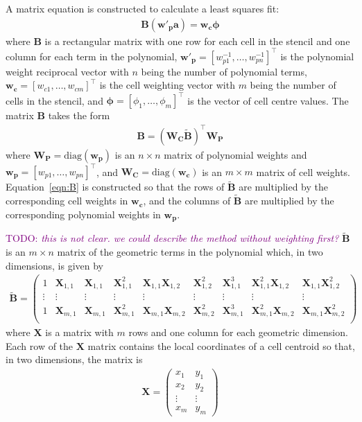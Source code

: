 \documentclass{article}
\newcommand{\TODO}[1]{\textcolor{purple}{TODO: \emph{#1}}}
\begin{document}
A matrix equation is constructed to calculate a least squares fit:
\begin{align}
	\mathbf{B} \left(\mathbf{w'_p} \mathbf{a}\right) = \mathbf{w_c} \bm{\phi}
\end{align}
where $\mathbf{B}$ is a rectangular matrix with one row for each cell in the stencil and one column for each term in the polynomial, $\mathbf{w'_p} = [w_{p1}^{-1}, \ldots, w_{pn}^{-1}]^\intercal$ is the polynomial weight reciprocal vector with $n$ being the number of polynomial terms,  $\mathbf{w_c} = [w_{c1}, \ldots, w_{cm}]^\intercal$ is the cell weighting vector with $m$ being the number of cells in the stencil, and $\bm{\phi} = [\phi_1, \ldots, \phi_m]^\intercal$ is the vector of cell centre values.
The matrix $\mathbf{B}$ takes the form
\begin{align}
	\mathbf{B} = \left( \mathbf{W_C} \mathbf{\tilde{B}} \right)^\intercal \mathbf{W_P} \label{eqn:B}
\end{align}
where $\mathbf{W_P} = \mathrm{diag}(\mathbf{w_p})$ is an $n \times n$ matrix of polynomial weights and $\mathbf{w_p} = [w_{p1}, \ldots, w_{pn}]^\intercal$, and $\mathbf{W_C} = \mathrm{diag}(\mathbf{w_c})$ is an $m \times m$ matrix of cell weights.  Equation~\ref{eqn:B} is constructed so that the rows of $\mathbf{\tilde{B}}$ are multiplied by the corresponding cell weights in $\mathbf{w_c}$, and the columns of $\mathbf{\tilde{B}}$ are multiplied by the corresponding polynomial weights in $\mathbf{w_p}$.

\TODO{this is not clear.  we could describe the method without weighting first?}
$\mathbf{\tilde{B}}$ is an $m \times n$ matrix of the geometric terms in the polynomial which, in two dimensions, is given by
\begin{align}
	\mathbf{\tilde{B}} = 
	\begin{pmatrix}
		1 & \mathbf{X}_{1,1} & \mathbf{X}_{1,1} & \mathbf{X}_{1,1}^2 & \mathbf{X}_{1,1} \mathbf{X}_{1,2} & \mathbf{X}_{1,2}^2 & \mathbf{X}_{1,1}^3 & \mathbf{X}_{1,1}^2 \mathbf{X}_{1,2} & \mathbf{X}_{1,1} \mathbf{X}_{1,2}^2 \\
		\vdots & \vdots & \vdots & \vdots & \vdots & \vdots & \vdots & \vdots & \vdots \\
		1 & \mathbf{X}_{m,1} & \mathbf{X}_{m,1} & \mathbf{X}_{m,1}^2 & \mathbf{X}_{m,1} \mathbf{X}_{m,2} & \mathbf{X}_{m,2}^2 & \mathbf{X}_{m,1}^3 & \mathbf{X}_{m,1}^2 \mathbf{X}_{m,2} & \mathbf{X}_{m,1} \mathbf{X}_{m,2}^2 \\
	\end{pmatrix}
\end{align}
where $\mathbf{X}$ is a matrix with $m$ rows and one column for each geometric dimension.  
Each row of the $\mathbf{X}$ matrix contains the local coordinates of a cell centroid so that, in two dimensions, the matrix is
\begin{align}
	\mathbf{X} = 
	\begin{pmatrix}
		x_1 & y_1 \\
		x_2 & y_2 \\
		\vdots & \vdots \\
		x_m & y_m
	\end{pmatrix}
\end{align}
\end{document}
